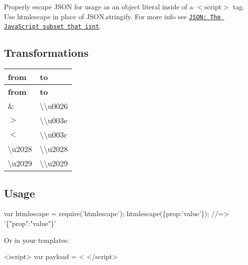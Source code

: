 Properly escape J\+S\+ON for usage as an object literal inside of a {\ttfamily $<$script$>$} tag. Use {\ttfamily htmlescape} in place of {\ttfamily J\+S\+O\+N.\+stringify}. For more info see \href{http://timelessrepo.com/json-isnt-a-javascript-subset}{\tt J\+S\+O\+N\+: The Java\+Script subset that isn\textquotesingle{}t}.

\subsection*{Transformations}

\tabulinesep=1mm
\begin{longtabu} spread 0pt [c]{*{2}{|X[-1]}|}
\hline
\rowcolor{\tableheadbgcolor}\textbf{ from  }&\textbf{ to   }\\
\endfirsthead
\hline
\endfoot
\hline
\rowcolor{\tableheadbgcolor}\textbf{ from  }&\textbf{ to   }\\
\endhead
{\ttfamily \&}  &{\ttfamily \textbackslash{}\textbackslash{}u0026}   \\
{\ttfamily $>$}  &{\ttfamily \textbackslash{}\textbackslash{}u003e}   \\
{\ttfamily $<$}  &{\ttfamily \textbackslash{}\textbackslash{}u003c}   \\
{\ttfamily \textbackslash{}u2028}  &{\ttfamily \textbackslash{}\textbackslash{}u2028}   \\
{\ttfamily \textbackslash{}u2029}  &{\ttfamily \textbackslash{}\textbackslash{}u2029}   \\
\end{longtabu}


\subsection*{Usage}


\begin{DoxyCode}
var htmlescape = require('htmlescape');
htmlescape(\{prop:'value'\});
//=> '\{"prop":"value"\}'
\end{DoxyCode}


Or in your templates\+:


\begin{DoxyCode}
<script>
var payload = <%
</script>
\end{DoxyCode}
 